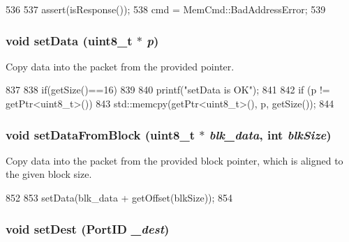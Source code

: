 \begin{DoxyCode}
536     {
537         assert(isResponse());
538         cmd = MemCmd::BadAddressError;
539     }
\end{DoxyCode}
\hypertarget{classPacket_aaa0b1cd19807fc630d9331be9f5d1d36}{
\subsubsection[{setData}]{\setlength{\rightskip}{0pt plus 5cm}void setData (uint8\_\-t $\ast$ {\em p})}}
\label{classPacket_aaa0b1cd19807fc630d9331be9f5d1d36}
Copy data into the packet from the provided pointer. 


\begin{DoxyCode}
837     {
838        if(getSize()==16)
839         {
840           printf("setData is OK\n");
841           }
842         if (p != getPtr<uint8_t>())
843             std::memcpy(getPtr<uint8_t>(), p, getSize());
844     }
\end{DoxyCode}
\hypertarget{classPacket_a0001ad64c160390fba5d1351862195ff}{
\subsubsection[{setDataFromBlock}]{\setlength{\rightskip}{0pt plus 5cm}void setDataFromBlock (uint8\_\-t $\ast$ {\em blk\_\-data}, \/  int {\em blkSize})}}
\label{classPacket_a0001ad64c160390fba5d1351862195ff}
Copy data into the packet from the provided block pointer, which is aligned to the given block size. 


\begin{DoxyCode}
852     {
853         setData(blk_data + getOffset(blkSize));
854     }
\end{DoxyCode}
\hypertarget{classPacket_a20739d8f669d352681830025686158ce}{
\subsubsection[{setDest}]{\setlength{\rightskip}{0pt plus 5cm}void setDest ({\bf PortID} {\em \_\-dest})}}
\label{classPacket_a20739d8f669d352681830025686158ce}


